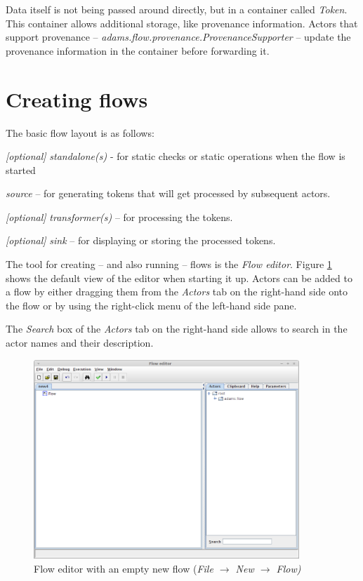 \noindent Data itself is not being passed around directly, but in a container
called \textit{Token}. This container allows additional storage, like provenance
information. Actors that support provenance -- \textit{adams.flow.provenance.ProvenanceSupporter} --
update the provenance information in the container before forwarding it.

\newpage
\section{Creating flows}
The basic flow layout is as follows:
\begin{tight_itemize}
  \item \textit{[optional]} \textit{standalone(s)} - for static checks or static
  operations when the flow is started
  \item \textit{source} -- for generating tokens that will get processed by
  subsequent actors.
  \item \textit{[optional]} \textit{transformer(s)} -- for processing the
  tokens.
  \item \textit{[optional]} \textit{sink} -- for displaying or storing the
  processed tokens.
\end{tight_itemize}
The tool for creating -- and also running -- flows is the \textit{Flow editor}.
Figure \ref{floweditor-newflow} shows the default view of the editor when
starting it up. Actors can be added to a flow by either dragging them from the
\textit{Actors} tab on the right-hand side onto the flow or by using the
right-click menu of the left-hand side pane.

The \textit{Search} box of the \textit{Actors} tab on the right-hand side allows
to search in the actor names and their description.

\begin{figure}[htb]
  \centering
  \includegraphics[width=10.0cm]{images/floweditor-new.png}
  \caption{Flow editor with an empty new flow
  (\textit{File $\rightarrow$ New $\rightarrow$ Flow)}}
  \label{floweditor-newflow}
\end{figure}

